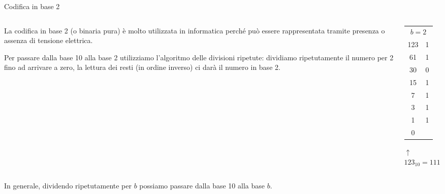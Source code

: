 \documentclass[aspectratio=169]{beamer}
\begin{document}
\begin{frame}{Codifica in base 2}
    \begin{columns}
        \begin{column}{0.7\textwidth}
            La codifica in base 2 (o binaria pura) è molto utilizzata in informatica perché può essere rappresentata tramite presenza o assenza di tensione elettrica.

            Per passare dalla base 10 alla base 2 utilizziamo l'algoritmo delle \alert{divisioni ripetute}: dividiamo ripetutamente il numero per 2 fino ad arrivare a zero, la lettura dei resti (in ordine inverso) ci darà il numero in base 2.
        \end{column}

        \begin{column}{0.2\textwidth}

            \pause

            \begin{tabular}{c|c}
                \multicolumn{2}{c}{$b=2$}\\
                123 & 1 \\
                61  & 1 \\
                30  & 0 \\
                15  & 1 \\
                7   & 1 \\
                3   & 1 \\
                1	& 1	\\
                0   &  \\
            \end{tabular}
            $\uparrow$
            $123_{10} = 1111011_2$
        \end{column}
    \end{columns}

In generale, dividendo ripetutamente per $b$ possiamo passare dalla base 10 alla base $b$.
\end{frame}
\end{document}
